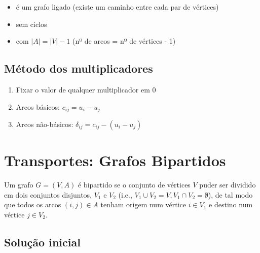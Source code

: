 \documentclass[10pt, a4paper]{article}
\begin{document}
\begin{multicols}{2}
\begin{itemize}
    \item é um grafo ligado (existe um caminho entre cada par de vértices)
    \item sem ciclos
    \item com \(|A| = |V| - 1\) (nº de arcos = nº de vértices - 1)
\end{itemize}

\subsection{Método dos multiplicadores}

\begin{enumerate}
    \item Fixar o valor de qualquer multiplicador em 0
    \item Arcos básicos: \(c_{ij} = u_i - u_j\)
    \item Arcos não-básicos: $\delta_{ij} = c_{ij} - (u_i - u_j)$
\end{enumerate}

%



\section{Transportes: Grafos Bipartidos}

Um grafo \(G = (V, A)\) é bipartido se o conjunto de vértices \(V\) puder ser dividido em dois conjuntos disjuntos, \(V_1\) e \(V_2\) (i.e., \(V_1 \cup V_2 = V, V_1 \cap V_2 = \emptyset\)), de tal modo que todos os arcos \((i,j) \in A\) tenham origem num vértice \(i \in V_1\) e destino num vértice \(j \in V_2\).

%

\subsection{Solução inicial}


\end{multicols}
\end{document}
